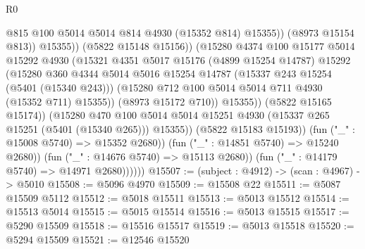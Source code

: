 \begin{lexlean}{R0}
\begin{coremodule}
                                        @815
                                        @100
                                        @5014
                                        @5014
                                        @814
                                        @4930
                                        (@15352 @814)
                                        @15355))
                                    (@8973 @15154 @813))
                                  @15355))
                              (@5822 @15148 @15156))
                            (@15280
                              @4374
                              @100
                              @15177
                              @5014
                              @15292
                              @4930
                              (@15321
                                @4351
                                @5017
                                @15176
                                (@4899 @15254 @14787)
                                @15292
                                (@15280
                                  @360
                                  @4344
                                  @5014
                                  @5016
                                  @15254
                                  @14787
                                  (@15337 @243 @15254 (@5401 (@15340 @243)))
                                  (@15280 @712 @100 @5014 @5014 @711 @4930 (@15352 @711) @15355))
                                (@8973 @15172 @710))
                              @15355))
                          (@5822 @15165 @15174))
                        (@15280
                          @470
                          @100
                          @5014
                          @5014
                          @15251
                          @4930
                          (@15337 @265 @15251 (@5401 (@15340 @265)))
                          @15355))
                      (@5822 @15183 @15193))
                    (fun ("_" : @15008 @5740) => @15352 @2680))
                  (fun ("_" : @14851 @5740) => @15240 @2680))
                (fun ("_" : @14676 @5740) => @15113 @2680))
              (fun ("_" : @14179 @5740) => @14971 @2680))))))
@15507 := (subject : @4912) -> (scan : @4967) -> @5010
@15508 := @5096 @4970
@15509 := @15508 @22
@15511 := @5087 @15509 @5112
@15512 := @5018 @15511
@15513 := @5013 @15512
@15514 := @15513 @5014
@15515 := @5015 @15514
@15516 := @5013 @15515
@15517 := @5290 @15509
@15518 := @15516 @15517
@15519 := @5013 @15518
@15520 := @5294 @15509
@15521 := @12546 @15520

\end{coremodule}
\end{lexlean}
